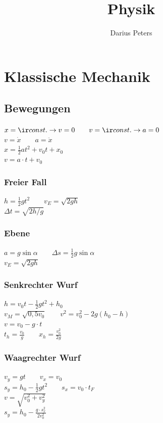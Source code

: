 \documentclass[german]{latex4ei/latex4ei_sheet}
\title{Physik}
\author{Darius Peters}                    %
\begin{document}
\maketitle   %

\section{Klassische Mechanik}

\subsection{Bewegungen}
$x={\ir const.} \rightarrow v=0 \qquad v={\ir const.} \rightarrow a=0$ \\
$v=\dot{x} \qquad a=\ddot{x}$ \\
$x=\frac{1}{2}at^2+v_0t+x_0$ \\
$v=a\cdot t + v_0$
\subsubsection{Freier Fall}
$h=\frac{1}{2}gt^2 \qquad v_E=\sqrt{2gh}$\\
$\Delta t = \sqrt{2h/g}$
\subsubsection{Ebene}
$a=g\sin \alpha \qquad \Delta s = \frac{1}{2}g\sin \alpha$\\
$v_E=\sqrt{2gh}$
\subsubsection{Senkrechter Wurf}
$h=v_0t-\frac{1}{2}gt^2+h_0$\\
$v_M=\sqrt{0,5v_0} \qquad v^2 = v_0^2-2g(h_0-h)$\\
$v=v_0-g\cdot t$\\
$t_h=\frac{v_0}{g} \qquad x_h=\frac{v_0^2}{2g}$
\subsubsection{Waagrechter Wurf}
$v_y=gt \qquad v_x = v_0$\\
$s_y=h_0-\frac{1}{2}gt^2 \qquad s_x=v_0\cdot t_F$\\
$v=\sqrt{v_0^2+v_y^2}$\\
$s_y=h_0-\frac{g\cdot s_x^2}{2v_0^2}$
\end{document}
